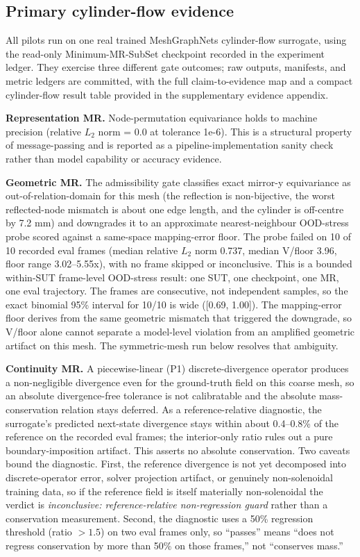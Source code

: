 \documentclass[preprint,12pt]{elsarticle}
\begin{document}
\subsection{Primary cylinder-flow evidence}
\label{subsec:within-sut-pilot}

All pilots run on one real trained MeshGraphNets cylinder-flow surrogate, using the read-only Minimum-MR-SubSet checkpoint recorded in the experiment ledger. They exercise three different gate outcomes; raw outputs, manifests, and metric ledgers are committed, with the full claim-to-evidence map and a compact cylinder-flow result table provided in the supplementary evidence appendix.

\textbf{Representation MR.} Node-permutation equivariance holds to machine precision (relative \(L_2\) norm = 0.0 at tolerance 1e-6). This is a structural property of message-passing and is reported as a pipeline-implementation sanity check rather than model capability or accuracy evidence.

\textbf{Geometric MR.} The admissibility gate classifies exact mirror-y equivariance as out-of-relation-domain for this mesh (the reflection is non-bijective, the worst reflected-node mismatch is about one edge length, and the cylinder is off-centre by 7.2 mm) and downgrades it to an approximate nearest-neighbour OOD-stress probe scored against a same-space mapping-error floor. The probe failed on 10 of 10 recorded eval frames (median relative \(L_2\) norm 0.737, median V/floor 3.96, floor range 3.02--5.55x), with no frame skipped or inconclusive. This is a bounded within-SUT frame-level OOD-stress result: one SUT, one checkpoint, one MR, one eval trajectory. The frames are consecutive, not independent samples, so the exact binomial 95\% interval for 10/10 is wide ([0.69, 1.00]). The mapping-error floor derives from the same geometric mismatch that triggered the downgrade, so V/floor alone cannot separate a model-level violation from an amplified geometric artifact on this mesh. The symmetric-mesh run below resolves that ambiguity.

\textbf{Continuity MR.} A piecewise-linear (P1) discrete-divergence operator produces a non-negligible divergence even for the ground-truth field on this coarse mesh, so an absolute divergence-free tolerance is not calibratable and the absolute mass-conservation relation stays deferred. As a reference-relative diagnostic, the surrogate's predicted next-state divergence stays within about 0.4--0.8\% of the reference on the recorded eval frames; the interior-only ratio rules out a pure boundary-imposition artifact. This asserts no absolute conservation. Two caveats bound the diagnostic. First, the reference divergence is not yet decomposed into discrete-operator error, solver projection artifact, or genuinely non-solenoidal training data, so if the reference field is itself materially non-solenoidal the verdict is \emph{inconclusive: reference-relative non-regression guard} rather than a conservation measurement. Second, the diagnostic uses a 50\% regression threshold (ratio $>1.5$) on two eval frames only, so ``passes'' means ``does not regress conservation by more than 50\% on those frames,'' not ``conserves mass.''
\end{document}
